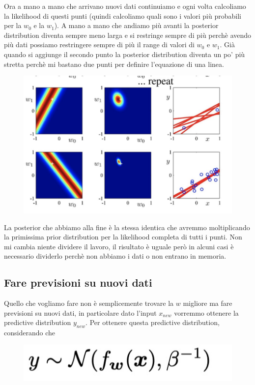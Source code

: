 \documentclass[14pt]{extreport}
\begin{document}
Ora a mano a mano che arrivano nuovi dati continuiamo e ogni volta calcoliamo la likelihood di questi punti (quindi calcoliamo quali sono i valori più
	probabili per la $w_0$ e la $w_1$). A mano a mano che andiamo più avanti la posterior distribution diventa sempre meno larga e si restringe sempre
	di più perchè avendo più dati possiamo restringere sempre di più il range di valori di $w_0$ e $w_1$. Già quando si aggiunge il secondo punto la
	posterior distribution diventa un po' più stretta perchè mi bastano due punti per definire l'equazione di una linea.

\begin{figure}[H]
\centering
\includegraphics[width=0.7\linewidth]{134.jpeg}
\end{figure}

La posterior che abbiamo alla fine è la stessa identica che avremmo moltiplicando la primissima prior distribution per la likelihood completa di tutti
i punti. Non mi cambia niente dividere il lavoro, il risultato è uguale però in alcuni casi è necessario dividerlo perchè non abbiamo i dati o non
entrano in memoria.

\subsection{Fare previsioni su nuovi dati}

Quello che vogliamo fare non è semplicemente trovare la $w$ migliore ma fare previsioni su nuovi dati, in particolare dato l'input $x_{new}$ vorremmo
ottenere la predictive distribution $y_{new}$. Per ottenere questa predictive distribution, considerando che 
\begin{figure}[H]
\centering
\includegraphics[width=0.4\linewidth]{135.jpeg}
\end{figure}
\end{document}
